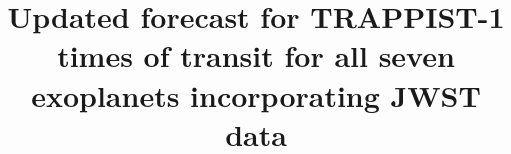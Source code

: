 \documentclass[modern]{aastex631}
\begin{document}
\title{Updated forecast for TRAPPIST-1 times of transit for all seven exoplanets incorporating JWST data}


\end{document}

